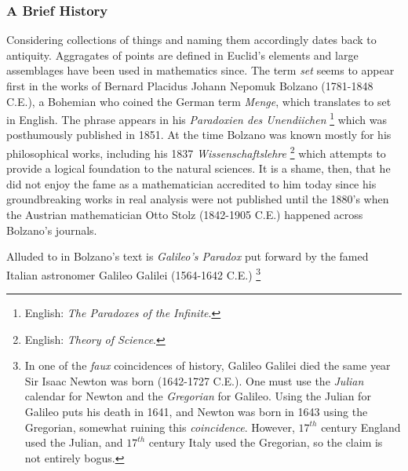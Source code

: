         \subsubsection{A Brief History}
            Considering collections of things and naming them accordingly dates
            back to antiquity. Aggragates of points are defined in Euclid's
            elements and large assemblages have been used in mathematics since.
            The term \textit{set} seems to appear first in the works of
            Bernard Placidus Johann Nepomuk Bolzano (1781-1848 C.E.), a Bohemian
            who coined the German term \textit{Menge}, which translates to set
            in English. The phrase appears in his
            \textit{Paradoxien des Unendiichen}%
            \footnote{%
                English: \textit{The Paradoxes of the Infinite}.
            }
            which was posthumously published in 1851. At the time Bolzano was
            known mostly for his philosophical works, including his 1837
            \textit{Wissenschaftslehre}%
            \footnote{%
                English: \textit{Theory of Science}.
            }
            which attempts to provide a logical foundation to the natural
            sciences. It is a shame, then, that he did not enjoy the fame as a
            mathematician accredited to him today since his groundbreaking works
            in real analysis were not published until the 1880's when the
            Austrian mathematician Otto Stolz
            (1842-1905 C.E.) happened across Bolzano's journals.
            \par\hfill\par
            Alluded to in Bolzano's text is \textit{Galileo's Paradox}%
             put forward by
            the famed Italian astronomer Galileo Galilei
            (1564-1642 C.E.)%
            \footnote{%
                In one of the \textit{faux} coincidences of history, Galileo
                Galilei died the same year Sir Isaac Newton was born
                (1642-1727 C.E.). One must use the \textit{Julian} calendar for
                Newton and the \textit{Gregorian} for Galileo. Using the
                Julian for Galileo puts his death in 1641, and Newton was born
                in 1643 using the Gregorian, somewhat ruining this
                \textit{coincidence}. However, $17^{th}$ century England used
                the Julian, and $17^{th}$ century Italy used the Gregorian, so
                the claim is not entirely bogus.
            }
